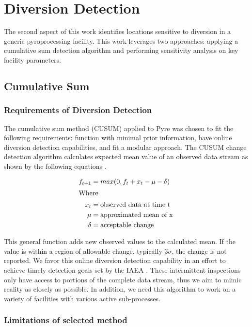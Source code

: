 \chapter[Diversion Detection]{Diversion Detection}

The second aspect of this work identifies locations sensitive to diversion in a generic pyroprocessing facility. This work leverages two approaches: applying
a cumulative sum detection algorithm and performing sensitivity analysis on key facility parameters. 
\section{Cumulative Sum}


\subsection{Requirements of Diversion Detection}
The cumulative sum method (CUSUM) applied to Pyre was chosen to fit the following requirements: function with minimal prior information, have online diversion detection
capabilities, and fit a modular approach. The CUSUM change detection algorithm calculates expected mean value of an observed data stream as shown by the following equations \cite{basseville_detection_1993}.

\begin{align}
	f_{t+1} &= max(0, f_t + x_t - \mu - \delta) \\
	\intertext{Where}
	x_t &= \mbox{observed data at time t} \nonumber \\
	\mu &= \mbox{approximated mean of x} \nonumber \\
	\delta &= \mbox{acceptable change} \nonumber
\end{align}

This general function adds new observed values to the calculated mean. If the value is within a region of allowable change, typically 3$\sigma$, the change is not reported. 
We favor this online diversion detection capability in an effort to achieve timely detection goals set by the IAEA \cite{international_atomic_energy_agency_implications_2004}.
These intermittent inspections only have access to portions of the complete data stream, thus we aim to mimic reality as closely as possible. In addition, we need this
algorithm to work on a variety of facilities with various active sub-processes.

\subsection{Limitations of selected method}

